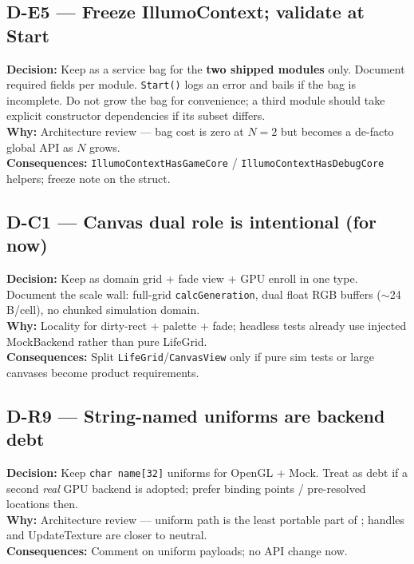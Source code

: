 \subsection*{D-E5 --- Freeze IllumoContext; validate at Start}
\begin{decisionbox}[title={D-E5 \quad 2026-07-28}]
\textbf{Decision:} Keep  as a service bag for the
\textbf{two shipped modules} only. Document required fields per module.
\texttt{Start()} logs an error and bails if the bag is incomplete.
Do not grow the bag for convenience; a third module should take explicit
constructor dependencies if its subset differs.\\
\textbf{Why:} Architecture review --- bag cost is zero at $N=2$ but becomes a
de-facto global API as $N$ grows.\\
\textbf{Consequences:} \texttt{IllumoContextHasGameCore} /
\texttt{IllumoContextHasDebugCore} helpers; freeze note on the struct.
\end{decisionbox}

\subsection*{D-C1 --- Canvas dual role is intentional (for now)}
\begin{decisionbox}[title={D-C1 \quad 2026-07-28}]
\textbf{Decision:} Keep  as domain grid + fade view + GPU
enroll in one type. Document the scale wall: full-grid
\texttt{calcGeneration}, dual float RGB buffers ($\sim$24\,B/cell), no
chunked simulation domain.\\
\textbf{Why:} Locality for dirty-rect + palette + fade; headless tests already
use injected MockBackend rather than pure LifeGrid.\\
\textbf{Consequences:} Split \texttt{LifeGrid}/\texttt{CanvasView} only if pure
sim tests or large canvases become product requirements.
\end{decisionbox}

\subsection*{D-R9 --- String-named uniforms are backend debt}
\begin{decisionbox}[title={D-R9 \quad 2026-07-28}]
\textbf{Decision:} Keep \texttt{char name[32]} uniforms for OpenGL + Mock.
Treat as debt if a second \emph{real} GPU backend is adopted; prefer binding
points / pre-resolved locations then.\\
\textbf{Why:} Architecture review --- uniform path is the least portable part
of ; handles and UpdateTexture are closer to neutral.\\
\textbf{Consequences:} Comment on uniform payloads; no API change now.
\end{decisionbox}

